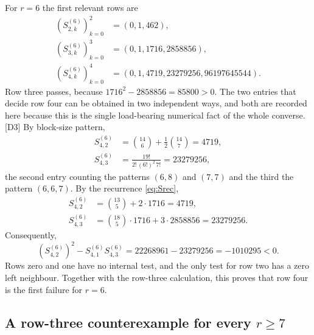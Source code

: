 \documentclass[11pt,a4paper]{article}
\numberwithin{equation}{section}
\theoremstyle{definition}
\theoremstyle{remark}
\newcommand{\dup}[1]{{\small\textsf{\color{MutedInk}[#1]}}}
\begin{document}
For $r=6$ the first relevant rows are
\begin{align*}
 (S^{(6)}_{2,k})_{k=0}^{2}&=(0,1,462),\\
 (S^{(6)}_{3,k})_{k=0}^{3}&=(0,1,1716,2858856),\\
 (S^{(6)}_{4,k})_{k=0}^{4}&=(0,1,4719,23279256,96197645544).
\end{align*}
Row three passes, because $1716^2-2858856=85800>0$. The two entries that
decide row four can be obtained in two independent ways, and both are
recorded here because this is the single load-bearing numerical fact of
the whole converse. \dup{D3} By block-size pattern,
\begin{align*}
 S^{(6)}_{4,2}&=\binom{14}{6}+\frac12\binom{14}{7}=4719,\\
 S^{(6)}_{4,3}&=\frac{19!}{2!\,(6!)^2\,7!}=23279256,
\end{align*}
the second entry counting the patterns $(6,8)$ and $(7,7)$ and the third
the pattern $(6,6,7)$. By the recurrence \eqref{eq:Srec},
\begin{align*}
 S^{(6)}_{4,2}&=\binom{13}{5}+2\cdot1716=4719,\\
 S^{(6)}_{4,3}&=\binom{18}{5}\cdot1716+3\cdot2858856=23279256 .
\end{align*}
Consequently,
\begin{equation}\label{eq:r6-counterexample}
 (S^{(6)}_{4,2})^2-S^{(6)}_{4,1}S^{(6)}_{4,3}
 =22268961-23279256=-1010295<0.
\end{equation}
Rows zero and one have no internal test, and the only test for row two has
a zero left neighbour. Together with the row-three calculation, this proves
that row four is the first failure for $r=6$.

\subsection{A row-three counterexample for every $r\ge7$}
\end{document}
